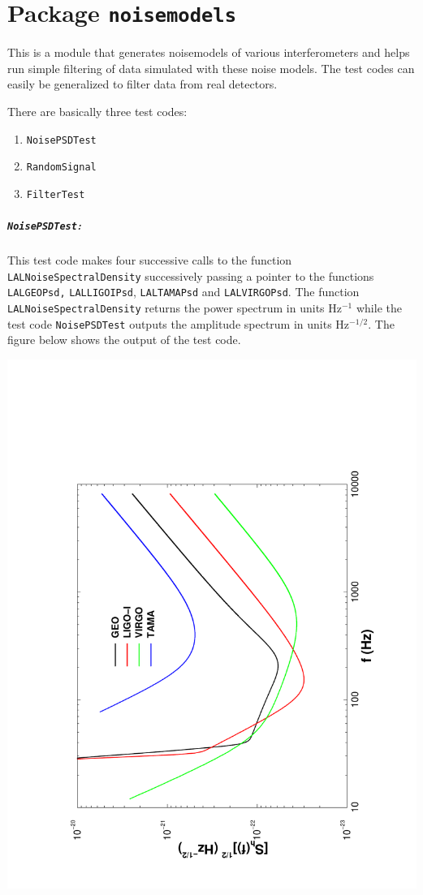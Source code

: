 \chapter{Package \texttt{noisemodels}}

This is a module that generates noisemodels of various interferometers
and helps run simple filtering of data simulated with these noise models.
The test codes can easily be generalized to filter data from real
detectors.

There are basically three test codes:
\begin{enumerate}
\item \texttt{NoisePSDTest}
\item \texttt{RandomSignal}
\item \texttt{FilterTest}
\end{enumerate}

\paragraph* {\texttt{NoisePSDTest}:} This test code makes four
successive calls to the function \texttt{LALNoiseSpectralDensity}
successively passing a pointer to the functions \texttt{LALGEOPsd,}
\texttt{LALLIGOIPsd}, \texttt{LALTAMAPsd} and \texttt {LALVIRGOPsd}.
The function \texttt{LALNoiseSpectralDensity} returns the power
spectrum in units Hz$^{-1}$ while the test code \texttt{NoisePSDTest}
outputs the amplitude spectrum in units Hz$^{-1/2}.$ The figure
below shows the output of the test  code.
\begin{center}
\includegraphics[angle=-90,width=4truein]{NoisePSDTest.pdf}
\end{center}

